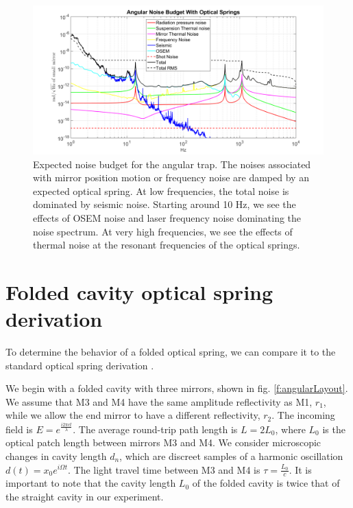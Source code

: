 \begin{figure}[htp]
\centering
\includegraphics[width=\textwidth]{figures/Angular/angNoise}
\caption[Angular trap noise prediction]{%
\label{f:angularNoise}
Expected noise budget for the angular trap. The noises associated with mirror position motion or frequency noise are damped by an expected optical spring. At low frequencies, the total noise is dominated by seismic noise. Starting around 10 Hz, we see the effects of OSEM noise and laser frequency noise dominating the noise spectrum. At very high frequencies, we see the effects of thermal noise at the resonant frequencies of the optical springs.
}
\end{figure}


\section{Folded cavity optical spring derivation}
\label{sec:foldedOS}
To determine the behavior of a folded optical spring, we can compare it to the standard optical spring derivation \cite{Perreca14}.

We begin with a folded cavity with three mirrors, shown in fig. \ref{f:angularLayout}. We assume that M3 and M4 have the same amplitude reflectivity as M1, $r_1$, while we allow the end mirror to have a different reflectivity, $r_2$. The incoming field is $E=e^{\frac{i 2 \pi c t}{\lambda}}$. The average round-trip path length is $L = 2L_0$, where $L_0$ is the optical patch length between mirrors M3 and M4. We consider microscopic changes in cavity length $d_n$, which are discreet samples of a harmonic oscillation $d(t) =  x_0 e^{i\Omega t}$. The light travel time between M3 and M4 is $\tau = \frac{L_0}{c}$. It is important to note that the cavity length $L_0$ of the folded cavity is twice that of the straight cavity in our experiment.

